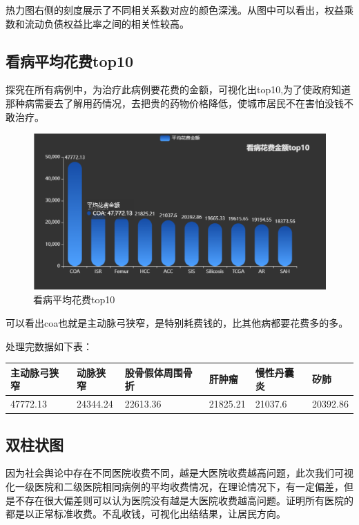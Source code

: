 \documentclass[12pt]{article}
\begin{document}
热力图右侧的刻度展示了不同相关系数对应的颜色深浅。从图中可以看出，权益乘数和流动负债权益比率之间的相关性较高。

\subsection{看病平均花费top10}
探究在所有病例中，为治疗此病例要花费的金额，可视化出top10,为了使政府知道那种病需要去了解用药情况，去把贵的药物价格降低，使城市居民不在害怕没钱不敢治疗。
\begin{figure}[ht]
\centering
\includegraphics[scale=0.8]{figures/6.png}
\caption{看病平均花费top10}\label{fig:label2}
\end{figure}

可以看出coa也就是主动脉弓狭窄，是特别耗费钱的，比其他病都要花费多的多。

处理完数据如下表：
\begin{table}[!ht]
    \centering
    \begin{tabular}{|l|l|l|l|l|l|}
    \hline
        主动脉弓狭窄   & 动脉狭窄  &  股骨假体周围骨折 & 肝肿瘤  &  慢性丹囊炎  &  矽肺 \\ \hline
        47772.13  & 24344.24  & 22613.36  & 21825.21  & 21037.6  & 20392.86  \\ \hline
    \end{tabular}
\end{table}


\subsection{双柱状图}

因为社会舆论中存在不同医院收费不同，越是大医院收费越高问题，此次我们可视化一级医院和二级医院相同病例的平均收费情况，在理论情况下，有一定偏差，但是不存在很大偏差则可以认为医院没有越是大医院收费越高问题。证明所有医院的都是以正常标准收费。不乱收钱，可视化出结结果，让居民方向。
\end{document}
